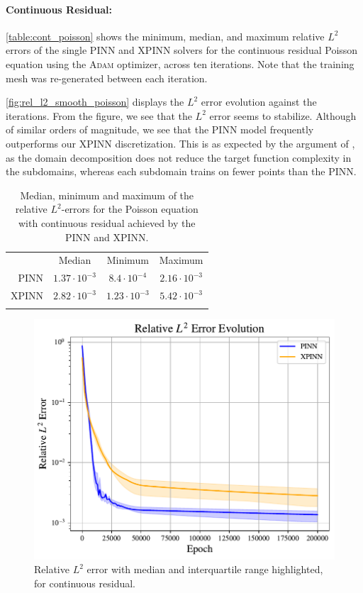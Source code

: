 \paragraph{Continuous Residual:}
\autoref{table:cont_poisson} shows the minimum, median, and maximum relative $L^2$ errors of the single PINN and XPINN solvers for the continuous residual Poisson equation using the \textsc{Adam} optimizer, across ten iterations.
Note that the training mesh was re-generated between each iteration.


\autoref{fig:rel_l2_smooth_poisson} displays the $L^2$ error evolution against the iterations.
From the figure, we see that the $L^2$ error seems to stabilize.
Although of similar orders of magnitude, we see that the PINN model frequently outperforms our XPINN discretization.
This is as expected by the argument of \textcite{XPINN_generalize}, as the domain decomposition does not reduce the target function complexity in the subdomains, whereas each subdomain trains on fewer points than the PINN. 

\begin{table}[h]
\caption{Median, minimum and maximum of the relative $L^2$-errors for the Poisson equation with continuous residual achieved by the PINN and XPINN.}
\centering
\begin{tabular}{r|c|c|c}\toprule
     & Median & Minimum & Maximum \\
    \colrule
    PINN & $1.37\cdot 10^{-3}$ &  $8.4 \cdot 10^{-4}$ & $2.16 \cdot 10^{-3}$ \\
    XPINN & $2.82\cdot 10^{-3} $ &  $1.23 \cdot 10^{-3}$ & $5.42 \cdot 10^{-3}$ \\
    \botrule
\end{tabular}
\label{table:cont_poisson}
\vspace{-0.5cm}
\end{table}
\begin{figure}[h!]
    \centering
    \includegraphics[width = 0.8\linewidth]{Project1XPINNs/figures/Poisson/smooth_l2_error_evolution.pdf}
    \caption{Relative $L^2$ error with median and interquartile range highlighted, for continuous residual.}
    \label{fig:rel_l2_smooth_poisson}
\end{figure}

